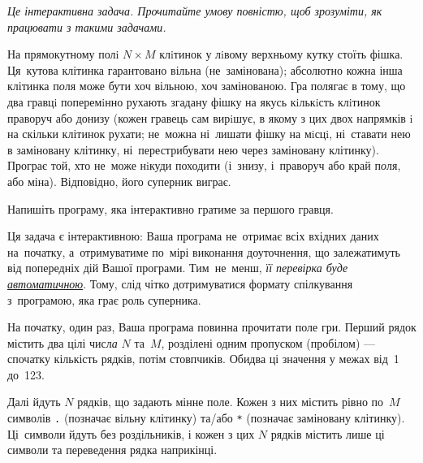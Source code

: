 ﻿{\it Це інтерактивна задача. Прочитайте умову повністю, щоб зрозуміти, як працювати з такими задачами.}

На прямокутному полi $N{\times}M$ клiтинок у лiвому верхньому кутку стоїть фішка. Ця~кутова клітинка гарантовано вільна (не~замінована); абсолютно кожна інша клітинка п{\it о}ля може бути хоч вільною, хоч замінованою. 
Гра полягає в тому, що два гравцi поперемiнно рухають згадану фішку на якусь кiлькiсть клiтинок праворуч або донизу (кожен гравець сам вирiшує, в якому з цих двох напрямків i на скільки клітинок рухати; не~можна ні~лишати фішку на мiсцi, ні~ставати нею в заміновану клітинку, ні~перестрибувати нею через заміновану клітинку).
Програє той, хто не~може нiкуди походити (і~знизу, і~праворуч або край п{\it о}ля, або міна). Відповідно, його суперник виграє.

Напишіть програму, яка інтерактивно гратиме за першого гравця. 

Ця задача є інтерактивною: 
Ваша програма не~отримає всіх вхідних даних на~початку,
а~отримуватиме по~мірі виконання доуточнення, 
що залежатимуть від попередніх дій Вашої програми. 
Тим~не~менш, {\it її перевірка буде
\underline{автоматичною}}. 
Тому, слід чітко дотримуватися формату спілкування з~програмою, яка грає роль суперника.


\Interaction

На початку, один раз, Ваша програма повинна прочитати поле гри.
Перший рядок містить два цілі числ{\it а} $N$ та~$M$, розділені одним пропуском (пробілом) --- спочатку кількість рядків, потім стовпчиків. Обидва ці значення у межах від~1 до~123.

Далі йдуть $N$ рядків, що задають мінне поле. Кожен з них містить рівно по~$M$ символів \texttt{.} (позначає вільну клітинку) та/або \texttt{*} (позначає заміновану клітинку). Ці~символи йдуть без роздільників, і кожен з цих $N$ рядків містить лише ці символи та переведення рядка наприкінці.

